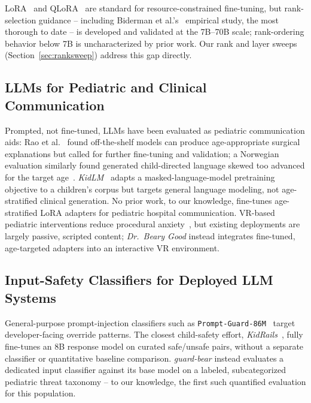 \documentclass[pdflatex,sn-mathphys-num]{sn-jnl}%
\begin{document}
LoRA~\cite{hu2022lora} and QLoRA~\cite{dettmers2023qlora} are standard for resource-constrained fine-tuning, but rank-selection guidance -- including Biderman et al.'s~\cite{biderman2024lora} empirical study, the most thorough to date -- is developed and validated at the 7B--70B scale; rank-ordering behavior below 7B is uncharacterized by prior work. Our rank and layer sweeps (Section~\ref{sec:ranksweep}) address this gap directly.

\subsection{LLMs for Pediatric and Clinical Communication}

Prompted, not fine-tuned, LLMs have been evaluated as pediatric communication aids: Rao et al.~\cite{rao2025pediatric} found off-the-shelf models can produce age-appropriate surgical explanations but called for further fine-tuning and validation; a Norwegian evaluation similarly found generated child-directed language skewed too advanced for the target age~\cite{hassan2025childconv}. \textit{KidLM}~\cite{nayeem2024kidlm} adapts a masked-language-model pretraining objective to a children's corpus but targets general language modeling, not age-stratified clinical generation. No prior work, to our knowledge, fine-tunes age-stratified LoRA adapters for pediatric hospital communication. VR-based pediatric interventions reduce procedural anxiety~\cite{ryu2021vr}, but existing deployments are largely passive, scripted content; \textit{Dr.\ Beary Good} instead integrates fine-tuned, age-targeted adapters into an interactive VR environment.

\subsection{Input-Safety Classifiers for Deployed LLM Systems}

General-purpose prompt-injection classifiers such as \texttt{Prompt-Guard-86M}~\cite{promptguard2024} target developer-facing override patterns. The closest child-safety effort, \textit{KidRails}~\cite{kidrails2025}, fully fine-tunes an 8B response model on curated safe/unsafe pairs, without a separate classifier or quantitative baseline comparison. \textit{guard-bear} instead evaluates a dedicated input classifier against its base model on a labeled, subcategorized pediatric threat taxonomy -- to our knowledge, the first such quantified evaluation for this population.
\end{document}
